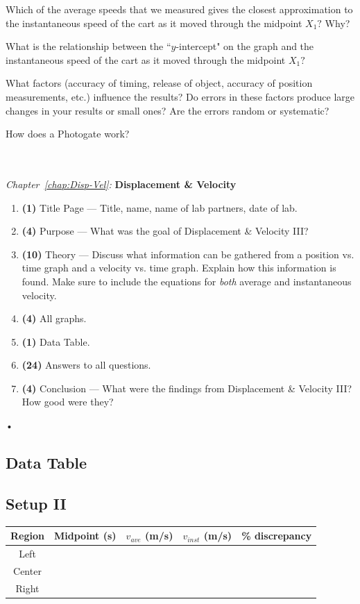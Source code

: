 \documentclass[main.tex]{subfiles}
\begin{document}
\begin{question}
Which of the average speeds that we measured gives the closest approximation to the instantaneous speed of the cart as it moved through the midpoint $X_1?$ Why?
\end{question}
\begin{question}
What is the relationship between the ``$y$-intercept" on the graph and the instantaneous speed of the cart as it moved through the midpoint $X_1?$
\end{question}
\begin{question}
What factors (accuracy of timing, release of object, accuracy of position measurements, etc.) influence the results? Do errors in these factors produce large changes in your results or small ones? Are the errors random or systematic?
\end{question}
\begin{question}
How does a Photogate work?
\end{question}

\begin{samepage}
\hrulefill\\ \\
\emph{Chapter~\ref{chap:Disp-Vel}:} \textbf{Displacement \& Velocity}
\begin{enumerate}
\item
\textbf{(1)} Title Page --- Title, name, name of lab partners, date of lab.
\item
\textbf{(4)} Purpose --- What was the goal of Displacement \& Velocity III?
\item
\textbf{(10)} Theory --- Discuss what information can be gathered from a position vs. time graph and a velocity vs. time graph. Explain how this information is found. Make sure to include the equations for \emph{both} average and instantaneous velocity.
\item
\textbf{(4)} All graphs.
\item
\textbf{(1)} Data Table.
\item
\textbf{(24)} Answers to all questions.
\item
\textbf{(4)} Conclusion --- What were the findings from Displacement \& Velocity III? How good were they?
\end{enumerate}•
\end{samepage}

\newpage
\begin{doublespace}
\section{Data Table}
\subsection*{Setup II}

\begin{tabular}{|c|c|c|c|c|}
\hline
Region & Midpoint (s) & $v_{ave}$ (m/s) & $v_{inst}$ (m/s) & \% discrepancy\\
\hline
Left &&&&\\
\hline
Center &&&&\\
\hline
Right &&&&\\
\hline
\end{tabular}

\end{doublespace}
\end{document}
